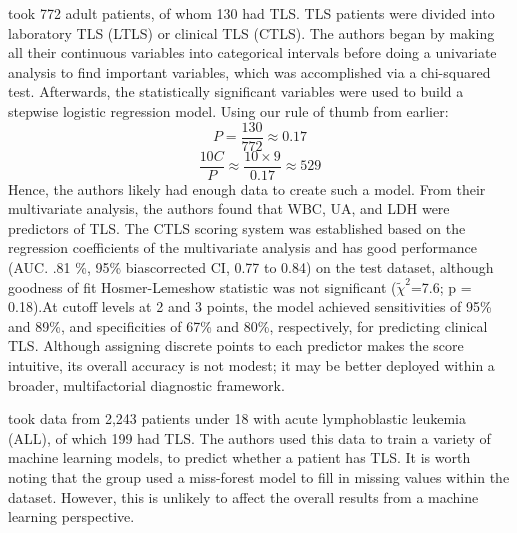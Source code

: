 \documentclass{article}
\begin{document}
\cite{xiao2024prediction} took 772 adult patients, of whom 130 had TLS. TLS patients were divided into laboratory TLS (LTLS) or clinical TLS (CTLS). The authors began by making all their continuous variables into categorical intervals before doing a univariate analysis to find important variables, which was accomplished via a chi-squared test. Afterwards, the statistically significant variables were used to build a stepwise logistic regression model. Using our rule of thumb from earlier:
\[P =\frac{130}{772} \approx 0.17 \]
\[ \frac{10C}{P} \approx \frac{10\times9}{0.17} \approx 529 \]
Hence, the authors likely had enough data to create such a model. From their multivariate analysis, the authors found that WBC, UA, and LDH were predictors of TLS. 
The CTLS scoring system was established based on the regression coefficients of the multivariate analysis and has good performance (AUC. .81 \%, 95\% bias\-corrected CI, 0.77 to 0.84) on the test dataset, although goodness of fit Hosmer-Lemeshow statistic was not significant (\(\tilde{\chi}^2\)=7.6; p = 0.18).At cut\-off levels at 2 and 3 points, the model achieved sensitivities of 95\% and 89\%, and specificities of 67\% and 80\%, respectively, for predicting clinical TLS. Although assigning discrete points to each predictor makes the score intuitive, its overall accuracy is not modest; it may be better deployed within a broader, multifactorial diagnostic framework.

\cite{mato2004predictive} took data from 2,243 patients under 18 with acute lymphoblastic leukemia (ALL), of which 199 had TLS. The authors used this data to train a variety of machine learning models, to predict whether a patient has TLS. It is worth noting that the group used a miss-forest model to fill in missing values within the dataset. However, this is unlikely to affect the overall results from a machine learning perspective.
\end{document}
